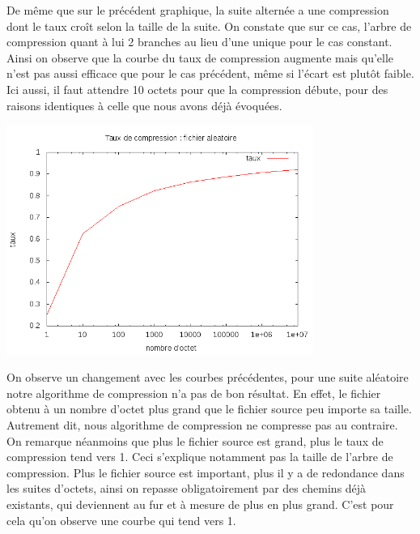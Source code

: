 \documentclass{report}
\begin{document}
De même que sur le précédent graphique, la suite alternée a une compression dont le taux croît selon la taille de la suite. On constate que sur ce cas, l'arbre de compression quant à lui 2 branches au lieu d'une unique pour le cas constant. Ainsi on observe que la courbe du taux de compression augmente mais qu'elle n'est pas aussi efficace que pour le cas précédent, même si l'écart est plutôt faible.
Ici aussi, il faut attendre 10 octets pour que la compression débute, pour des raisons identiques à celle que nous avons déjà évoquées.  

\begin{center}
\includegraphics[width=10cm]{LZAleatoire.png}
\end{center}

On observe un changement avec les courbes précédentes, pour une suite aléatoire notre algorithme de compression n'a pas de bon résultat. En effet, le fichier obtenu à un nombre d'octet plus grand que le fichier source peu importe sa taille. Autrement dit, nous algorithme de compression ne compresse pas au contraire. 
On remarque néanmoins que plus le fichier source est grand, plus le taux de compression tend vers 1. Ceci s'explique notamment pas la taille de l'arbre de compression. Plus le fichier source est important, plus il y a de redondance dans les suites d'octets, ainsi on repasse obligatoirement par des chemins déjà existants, qui deviennent au fur et à mesure de plus en plus grand. 
C'est pour cela qu'on observe une courbe qui tend vers 1. 
\end{document}
